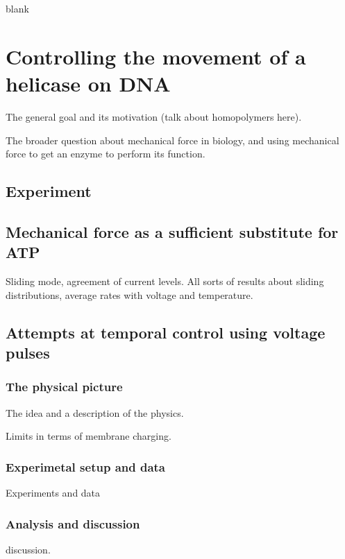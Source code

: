 \begin{savequote}[75mm]
blank
\end{savequote}

\chapter{Controlling the movement of a helicase on DNA}
\label{helicase_motion_control}

The general goal and its motivation (talk about homopolymers here).

The broader question about mechanical force in biology, and using mechanical force to get an enzyme to perform its function.

\section{Experiment}

\section{Mechanical force as a sufficient substitute for ATP}

Sliding mode, agreement of current levels.  All sorts of results about sliding distributions, average rates with voltage and temperature.

\section{Attempts at temporal control using voltage pulses}

\subsection{The physical picture}
The idea and a description of the physics.

Limits in terms of membrane charging.

\subsection{Experimetal setup and data}

Experiments and data

\subsection{Analysis and discussion}

discussion.
